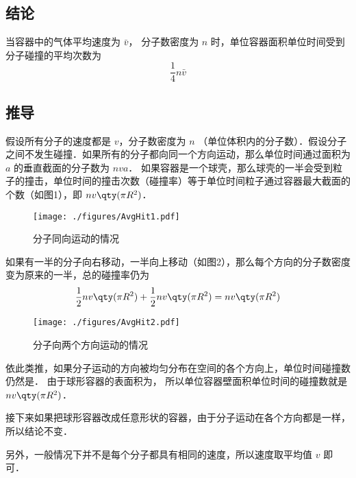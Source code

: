 
\subsection{结论}

当容器中的气体平均速度为 $\bar v$， 分子数密度为 $n$ 时，单位容器面积单位时间受到分子碰撞的平均次数为
\begin{equation}
\frac14 n\bar v
\end{equation}
\subsection{推导}

假设所有分子的速度都是 $v$，分子数密度为 $n$ （单位体积内的分子数）．假设分子之间不发生碰撞．如果所有的分子都向同一个方向运动，那么单位时间通过面积为 $a$ 的垂直截面的分子数为 $nva$． 如果容器是一个球壳，那么球壳的一半会受到粒子的撞击，单位时间的撞击次数（碰撞率）等于单位时间粒子通过容器最大截面的个数（如图1），即 $nv \qty(\pi R^2)$． 
\begin{figure}[ht]
\centering
\texttt{[image: ./figures/AvgHit1.pdf]}
\caption{分子同向运动的情况} \label{AvgHit_fig1}
\end{figure}
如果有一半的分子向右移动，一半向上移动（如图2），那么每个方向的分子数密度变为原来的一半，总的碰撞率仍为
\begin{equation}
\frac12 nv \qty(\pi R^2) + \frac12 nv \qty(\pi R^2) = nv \qty(\pi R^2)
\end{equation}

\begin{figure}[ht]
\centering
\texttt{[image: ./figures/AvgHit2.pdf]}
\caption{分子向两个方向运动的情况} \label{AvgHit_fig2}
\end{figure}
依此类推，如果分子运动的方向被均匀分布在空间的各个方向上，单位时间碰撞数仍然是．
由于球形容器的表面积为， 所以单位容器壁面积单位时间的碰撞数就是 $nv \qty(\pi R^2)$． 

接下来如果把球形容器改成任意形状的容器，由于分子运动在各个方向都是一样，所以结论不变．

另外，一般情况下并不是每个分子都具有相同的速度，所以速度取平均值 $v$ 即可．

